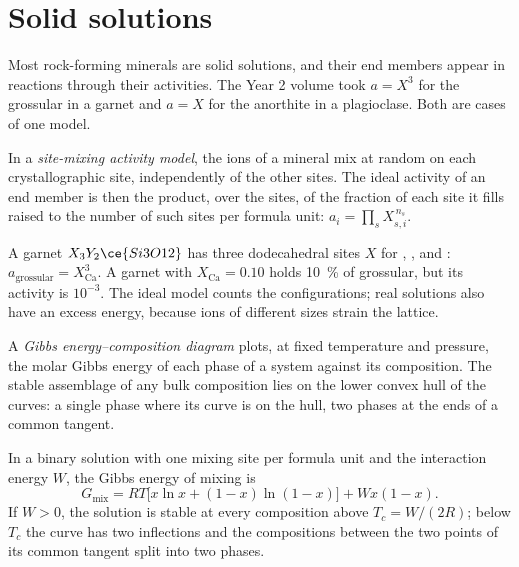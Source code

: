 \section{Solid solutions}\label{sec:b3:petrological-thermodynamics:solutions}

Most rock-forming minerals are solid solutions, and their end members appear
in reactions through their activities. The Year 2 volume took $a = X^3$ for
the grossular in a garnet and $a = X$ for the anorthite in a plagioclase.
Both are cases of one model.

\begin{definition}\label{def:b3:petrological-thermodynamics:site-mixing}
In a \emph{site-mixing activity model}, the
ions of a mineral mix at random on each crystallographic site, independently
of the other sites. The ideal activity of an end member is then the product,
over the sites, of the fraction of each site it fills raised to the number of
such sites per formula unit: $a_i = \prod_s X_{s,i}^{\,n_s}$.
\end{definition}

A garnet $X_3Y_2\ce{Si3O12}$ has three dodecahedral sites $X$ for
, ,  and : $a_{\text{grossular}} =
X_{\text{Ca}}^3$. A garnet with $X_{\text{Ca}} = 0.10$ holds
\qty{10}{\percent} of grossular, but its activity is $10^{-3}$. The ideal
model counts the configurations; real solutions also have an excess energy,
because ions of different sizes strain the lattice.

\begin{definition}\label{def:b3:petrological-thermodynamics:gx}
A \emph{Gibbs energy--composition diagram}
plots, at fixed temperature and pressure, the molar Gibbs energy of
each phase of a system against its composition. The stable assemblage of any
bulk composition lies on the lower convex hull of the curves: a single phase
where its curve is on the hull, two phases at the ends of a common tangent.
\end{definition}

\begin{proposition}\label{prop:b3:petrological-thermodynamics:regular}
In a binary solution with one mixing site per formula unit and the
interaction energy $W$, the Gibbs energy of mixing is
\[
  G_{\text{mix}} = RT\bigl[x\ln x + (1 - x)\ln(1 - x)\bigr] + Wx(1 - x).
\]
If $W > 0$, the solution is stable at every composition above $T_c =
W/(2R)$; below $T_c$ the curve has two inflections and the compositions
between the two points of its common tangent split into two phases.
\end{proposition}

